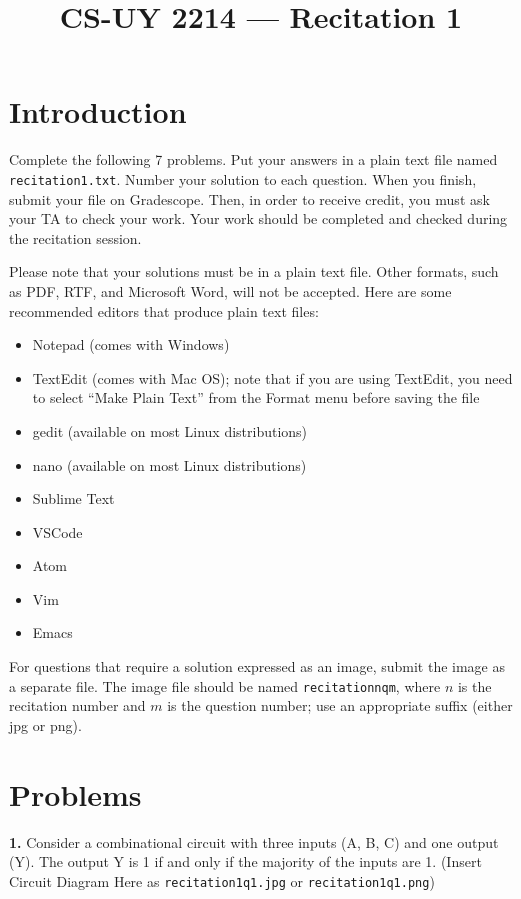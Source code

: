 \documentclass{article}
\title{CS-UY 2214 — Recitation 1}
\date{}
\begin{document}
\maketitle

\section*{Introduction}
Complete the following 7 problems. Put your answers in a plain text file named \texttt{recitation1.txt}. Number your solution to each question. When you finish, submit your file on Gradescope. Then, in order to receive credit, you must ask your TA to check your work. Your work should be completed and checked during the recitation session.

Please note that your solutions must be in a plain text file. Other formats, such as PDF, RTF, and Microsoft Word, will not be accepted. Here are some recommended editors that produce plain text files:
\begin{itemize}
    \item Notepad (comes with Windows)
    \item TextEdit (comes with Mac OS); note that if you are using TextEdit, you need to select “Make Plain Text” from the Format menu before saving the file
    \item gedit (available on most Linux distributions)
    \item nano (available on most Linux distributions)
    \item Sublime Text
    \item VSCode
    \item Atom
    \item Vim
    \item Emacs
\end{itemize}

For questions that require a solution expressed as an image, submit the image as a separate file. The image file should be named \texttt{recitationnqm}, where $n$ is the recitation number and $m$ is the question number; use an appropriate suffix (either jpg or png).

\section*{Problems}
\noindent\textbf{1.}  Consider a combinational circuit with three inputs (A, B, C) and one output (Y). The output Y is 1 if and only if the majority of the inputs are 1.  (Insert Circuit Diagram Here as \texttt{recitation1q1.jpg} or \texttt{recitation1q1.png})
\end{document}
